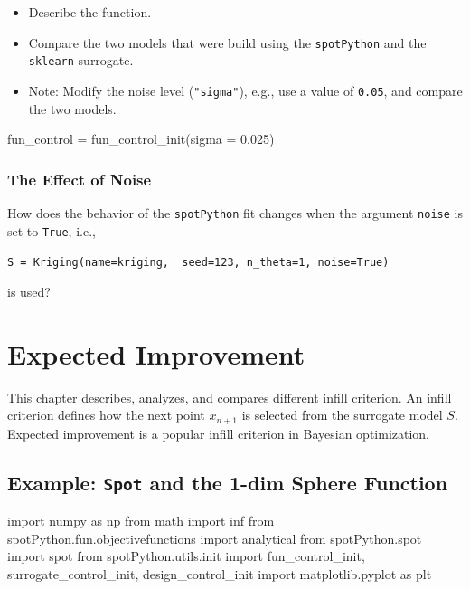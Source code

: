 \documentclass[
  letterpaper,
  DIV=11,
  numbers=noendperiod]{scrreprt}
\newenvironment{Shaded}{\begin{snugshade}}{\end{snugshade}}
\newcommand{\FloatTok}[1]{\textcolor[rgb]{0.68,0.00,0.00}{#1}}
\newcommand{\ImportTok}[1]{\textcolor[rgb]{0.00,0.46,0.62}{#1}}
\newcommand{\NormalTok}[1]{\textcolor[rgb]{0.00,0.23,0.31}{#1}}
\newcommand{\OperatorTok}[1]{\textcolor[rgb]{0.37,0.37,0.37}{#1}}
\providecommand{\tightlist}{%
  \setlength{\itemsep}{0pt}\setlength{\parskip}{0pt}}\usepackage{longtable,booktabs,array}
\begin{document}
\begin{itemize}
\tightlist
\item
  Describe the function.
\item
  Compare the two models that were build using the \texttt{spotPython}
  and the \texttt{sklearn} surrogate.
\item
  Note: Modify the noise level (\texttt{"sigma"}), e.g., use a value of
  \texttt{0.05}, and compare the two models.
\end{itemize}

\begin{Shaded}
\begin{Highlighting}[]
\NormalTok{fun\_control }\OperatorTok{=}\NormalTok{ fun\_control\_init(sigma }\OperatorTok{=} \FloatTok{0.025}\NormalTok{)}
\end{Highlighting}
\end{Shaded}

\subsection{The Effect of Noise}\label{the-effect-of-noise}

How does the behavior of the \texttt{spotPython} fit changes when the
argument \texttt{noise} is set to \texttt{True}, i.e.,

\texttt{S\ =\ Kriging(name=\textquotesingle{}kriging\textquotesingle{},\ \ seed=123,\ n\_theta=1,\ noise=True)}

is used?

\chapter{Expected Improvement}\label{sec-expected-improvement}

This chapter describes, analyzes, and compares different infill
criterion. An infill criterion defines how the next point \(x_{n+1}\) is
selected from the surrogate model \(S\). Expected improvement is a
popular infill criterion in Bayesian optimization.

\section{\texorpdfstring{Example: \texttt{Spot} and the 1-dim Sphere
Function}{Example: Spot and the 1-dim Sphere Function}}\label{example-spot-and-the-1-dim-sphere-function}

\begin{Shaded}
\begin{Highlighting}[]
\ImportTok{import}\NormalTok{ numpy }\ImportTok{as}\NormalTok{ np}
\ImportTok{from}\NormalTok{ math }\ImportTok{import}\NormalTok{ inf}
\ImportTok{from}\NormalTok{ spotPython.fun.objectivefunctions }\ImportTok{import}\NormalTok{ analytical}
\ImportTok{from}\NormalTok{ spotPython.spot }\ImportTok{import}\NormalTok{ spot}
\ImportTok{from}\NormalTok{ spotPython.utils.init }\ImportTok{import}\NormalTok{ fun\_control\_init, surrogate\_control\_init, design\_control\_init}
\ImportTok{import}\NormalTok{ matplotlib.pyplot }\ImportTok{as}\NormalTok{ plt}
\end{Highlighting}
\end{Shaded}
\end{document}
